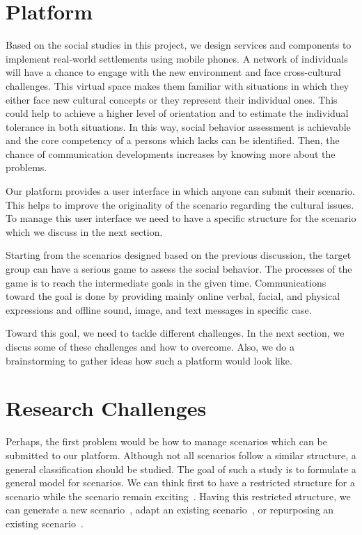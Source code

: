 \documentclass[conference]{IEEEtran}
\begin{document}

\section{Platform}
Based on the social studies in this project, we design services and components to implement real-world settlements using mobile phones. A network of individuals will have a chance to engage with the new environment and face cross-cultural challenges. This virtual space makes them familiar with situations in which they either face new cultural concepts or they represent their individual ones. This could help to achieve a higher level of orientation and to estimate the individual tolerance in both situations. In this way, social behavior assessment is achievable and the core competency of a persons which lacks can be identified. Then, the chance of communication developments increases by knowing more about the problems.

Our platform provides a user interface in which anyone can submit their scenario.
This helps to improve the originality of the scenario regarding the cultural issues.
To manage this user interface we need to have a specific structure for the scenario
which we discuss in the next section.

Starting from the scenarios designed based on the previous discussion,
the target group can have a serious game to assess the social behavior.
The processes of the game is to reach the intermediate goals in the given time.
Communications toward the goal is done by providing mainly online verbal, facial, and physical expressions and offline sound, image, and text messages in specific case. 

Toward this goal, we need to tackle different challenges. In the next section, we discus
some of these challenges and how to overcome. Also, we do a brainstorming to gather ideas
how such a platform would look like.

\section{Research Challenges}
Perhaps, the first problem would be how to manage scenarios
which can be submitted to our platform.
Although not all scenarios follow a similar structure,
a general classification should be studied. 
The goal of such a study is to 
formulate a general model for scenarios.
We can think first to have a restricted structure for a scenario
while the scenario remain exciting~\cite{scenario}.
Having this restricted structure, we can generate a new scenario~\cite{scenario-gen,l-system},
adapt an existing scenario~\cite{scenario-adapt}, 
or repurposing an existing scenario~\cite{scenario-repurposing}.
\end{document}
